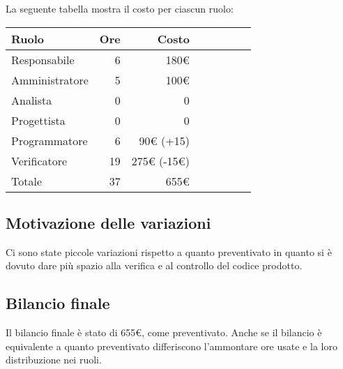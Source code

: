 La seguente tabella mostra il costo per ciascun ruolo:
\begin{table}[ht]
    \begin{tabularx}{\linewidth}{X|rrrrrrr}
    \rowcolor{gray!30}Ruolo & Ore & Costo \\
    \hline
    Responsabile                            & 6    & 180€\\
    \rowcolor{gray!10}Amministratore        & 5    & 100€  \\
    Analista                                & 0    & 0\\
    \rowcolor{gray!10}Progettista           & 0    & 0\\
    Programmatore                           & 6    & 90€ (+15) \\
    \rowcolor{gray!10}Verificatore          & 19   & 275€ (-15€) \\
    \hline Totale                           & 37   & 655€\\ 
    \end{tabularx}
\end{table}

\subsection{Motivazione delle variazioni}
Ci sono state piccole variazioni rispetto a quanto preventivato in quanto si è dovuto dare più spazio alla verifica e al controllo del codice prodotto.

\subsection{Bilancio finale}
Il bilancio finale è stato di 655€, come preventivato. Anche se il bilancio è equivalente a quanto preventivato differiscono l'ammontare ore usate e la loro distribuzione nei ruoli.
